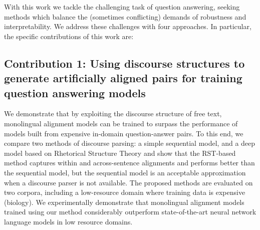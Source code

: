 With this work we tackle the challenging task of question answering, seeking methods which balance the (sometimes conflicting) demands of robustness and interpretability.  We  address these challenges with four approaches.  In particular, the specific contributions of this work are:


\subsection{Contribution 1: Using discourse structures to generate artificially aligned pairs for training question answering models} 
We demonstrate that by exploiting the discourse structure of free text, monolingual alignment models can be trained to surpass the performance of models built from expensive in-domain question-answer pairs.  To this end, we compare two methods of discourse parsing: a simple sequential model, and a deep model based on Rhetorical Structure Theory \citep[RST][]{mann88} and show that the RST-based method captures within and across-sentence alignments and performs better than the sequential model, but the sequential model is an acceptable approximation when a discourse parser is not available.  The proposed methods are evaluated on two corpora, including a low-resource domain where training data is expensive (biology). We experimentally demonstrate that monolingual alignment models trained using our method considerably outperform state-of-the-art neural network language models in low resource domains.

